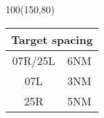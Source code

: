 \documentclass[10pt,landscape,a4paper]{article}
\begin{document}
\begin{textblock}{100}(150,80)
  \begin{table}[]
    \begin{tabular}{|c|l|}
      \multicolumn{2}{c}{\textbf{Target spacing}} \\ \hline
      07R/25L & 6NM                               \\ \hline
      07L     & 3NM                               \\ \hline
      25R     & 5NM                               \\ \hline
    \end{tabular}
  \end{table}
\end{textblock}
\end{document}

